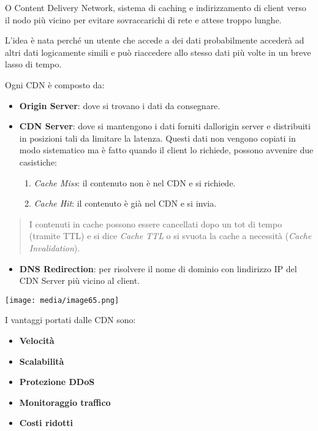 O Content Delivery Network, sistema di caching e indirizzamento di
client verso il nodo più vicino per evitare sovraccarichi di rete e
attese troppo lunghe.

L'idea è nata perché un utente che accede a dei dati probabilmente
accederà ad altri dati logicamente simili e può riaccedere allo stesso
dati più volte in un breve lasso di tempo.

Ogni CDN è composto da:

\begin{itemize}
\item
  \textbf{Origin Server}: dove si trovano i dati da consegnare.
\item
  \textbf{CDN Server}: dove si mantengono i dati forniti
  dall\textquotesingle origin server e distribuiti in posizioni tali da
  limitare la latenza. Questi dati non vengono copiati in modo
  sistematico ma è fatto quando il client lo richiede, possono avvenire
  due casistiche:

  \begin{enumerate}
  \def\labelenumi{\arabic{enumi}.}
  \item
    \emph{Cache Miss}: il contenuto non è nel CDN e si richiede.
  \item
    \emph{Cache Hit}: il contenuto è già nel CDN e si invia.
  \end{enumerate}
\end{itemize}

\begin{quote}
I contenuti in cache possono essere cancellati dopo un tot di tempo
(tramite TTL) e si dice \emph{Cache TTL} o si svuota la cache a
necessità (\emph{Cache Invalidation}).
\end{quote}

\begin{itemize}
\item
  \textbf{DNS Redirection}: per risolvere il nome di dominio con
  l\textquotesingle indirizzo IP del CDN Server più vicino al client.
\end{itemize}

\texttt{[image: media/image65.png]}

I vantaggi portati dalle CDN sono:

\begin{itemize}
\item
  \textbf{Velocità}
\item
  \textbf{Scalabilità}
\item
  \textbf{Protezione DDoS}
\item
  \textbf{Monitoraggio traffico}
\item
  \textbf{Costi ridotti}
\end{itemize}

